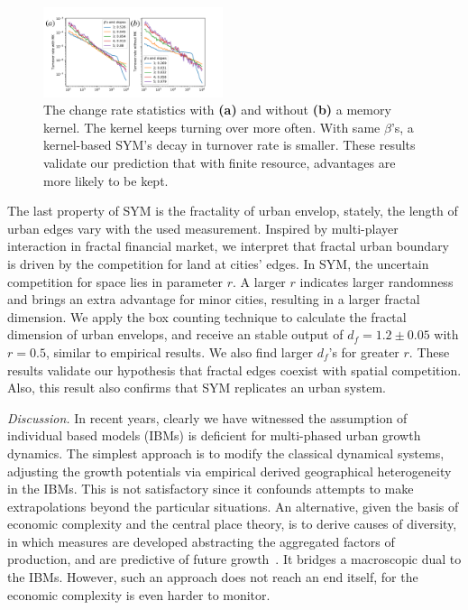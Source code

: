 \documentclass[reprint,unsortedaddress,amsmath,amssymb,aps,prl,showkeys]{revtex4-2}
\begin{document}
\begin{figure}
	\centering
	\includegraphics[width = 0.47\textwidth]{pics/in_one_now_now.pdf}
	\caption{The change rate statistics with \textbf{(a)} and without \textbf{(b)} a memory kernel. The kernel keeps turning over more often. With same $\beta$'s, a kernel-based SYM's decay in turnover rate is smaller. These results validate our prediction that with finite resource, advantages are more likely to be kept.}
	\label{changerate}
\end{figure}

The last property of SYM is the fractality of urban envelop, stately, the length of urban edges vary with the used measurement. Inspired by multi-player interaction in fractal financial market\cite{PhysRevE.65.037106}, we interpret that fractal urban boundary is driven by the competition for land at cities' edges. In SYM, the uncertain competition for space lies in parameter $r$. A larger $r$ indicates larger randomness and brings an extra advantage for minor cities, resulting in a larger fractal dimension. We apply the box counting technique to calculate the fractal dimension of urban envelops, and receive an stable output of $d_f = 1.2\pm 0.05$ with $r = 0.5$, similar to empirical results\cite{batty1992form}. We also find larger $d_f$'s for greater $r$. These results validate our hypothesis that fractal edges coexist with spatial competition. Also, this result also confirms that SYM replicates an urban system.

\textit{Discussion.} In recent years, clearly we have witnessed the assumption of individual based models (IBMs) is deficient for multi-phased urban growth dynamics. The simplest approach is to modify the classical dynamical systems, adjusting the growth potentials via empirical derived geographical heterogeneity in the IBMs. This is not satisfactory since it confounds attempts to make extrapolations beyond the particular situations. An alternative, given the basis of economic complexity and the central place theory, is to derive causes of diversity, in which measures are developed abstracting the aggregated factors of production, and are predictive of future growth~\cite{Hidalgo10570}. It bridges a macroscopic dual to the IBMs. However, such an approach does not reach an end itself, for the economic complexity is even harder to monitor. 
\end{document}
